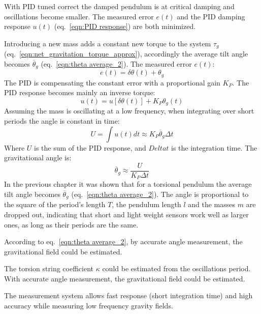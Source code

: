 \documentclass[\main/master.tex]{subfiles}
\begin{document}
\par\noindent
With PID tuned correct the damped pendulum is at critical damping and oscillations become smaller. The measured error $e(t)$ and the PID damping response $u(t)$ (eq.~\ref{eqn:PID response}) are both minimized. 
\par\noindent
Introducing a new mass adds a constant new torque to the system $\tau_g$ (eq.~\ref{eqn:net_gravitation_torque_approx}), accordingly the average tilt angle becomes $\overline{\theta}_g$ (eq.~\ref{eqn:theta average_2}). The measured error $e(t)$:
\begin{equation}
e(t) = \delta\theta(t) + \theta_g    \label{eqn:error_measurement}
\end{equation}
The PID is compensating the constant error with a proportional gain $K_P$. The PID response becomes mainly an inverse torque:
\begin{equation}
u(t) = u[ \delta\theta(t)] + K_P\theta_g(t) \label{eqn:PID_response}
\end{equation}
Assuming the mass is oscillating at a low frequency, when integrating over short periods the angle is constant in time:
\begin{equation}
U = \int u(t) dt  \approx K_P\overline{\theta}_g\Delta t \label{eqn:PID_measurement_eqn}
\end{equation}
Where $U$ is the sum of the PID response, and $Delta t$ is the integration time. The gravitational angle is:
\begin{equation}
\overline{\theta}_g \approx \frac{U}{K_P\Delta t}      \label{eqn:pid_gravitation_torque}
\end{equation}
In the previous chapter it was shown that for a torsional pendulum the average tilt angle becomes $\overline{\theta}_g$ (eq.~\ref{eqn:theta average_2}). The angle is proportional to the square of the period's length $T$, the pendulum length $l$ and the masses $m$ are dropped out, indicating that short and light weight sensors work well as larger ones, as long as their periods are the same.
\par\noindent
According to eq.~\ref{eqn:theta average_2}, by accurate angle measurement, the gravitational field could be estimated.
 

\par\noindent
The torsion string coefficient $\kappa$ could be estimated from the oscillations period. With accurate angle measurement, the gravitational field could be estimated.
\par\noindent
The measurement system allows fast response (short integration time) and high accuracy while measuring low frequency gravity fields. 

 
 
 
 
\end{document}
